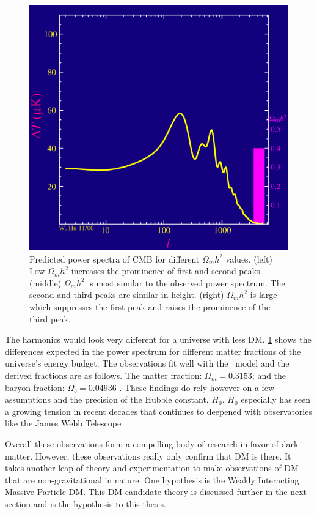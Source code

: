 \begin{figure}[ht]
{        \includegraphics[scale=0.285]{figures/LCDM_multipole/frame_16_delay-0.2s.png}
        \caption{Predicted power spectra of CMB for different $\Omega_m h^2$ values. (left) Low $\Omega_m h^2$ increases the prominence of first and second peaks. (middle) $\Omega_m h^2$ is most similar to the observed power spectrum. The second and third peaks are similar in height. (right) $\Omega_mh^2$ is large which suppresses the first peak and raises the prominence of the third peak.}
        \label{fig:CMB_vibratemodes}
    }
\end{figure}

The harmonics would look very different for a universe with less DM.
\cref{fig:CMB_vibratemodes} shows the differences expected in the power spectrum for different matter fractions of the universe's energy budget.
The observations fit well with the \lcdm~model and the derived fractions are as follows.
The matter fraction: $\Omega_m = 0.3153$; and the baryon fraction: $\Omega_b = 0.04936$ \cite{Plank:CMB}.
These findings do rely however on a few assumptions and the precision of the Hubble constant, $H_0$.
$H_0$ especially has seen a growing tension in recent decades that continues to deepened with observatories like the James Webb Telescope \cite{JWST:hubble_tension,Freedman:hubble_tension}

Overall these observations form a compelling body of research in favor of dark matter.
However, these observations really only confirm that DM is there.
It takes another leap of theory and experimentation to make observations of DM that are non-gravitational in nature.
One hypothesis is the Weakly Interacting Massive Particle DM.
This DM candidate theory is discussed further in the next section and is the hypothesis to this thesis.

